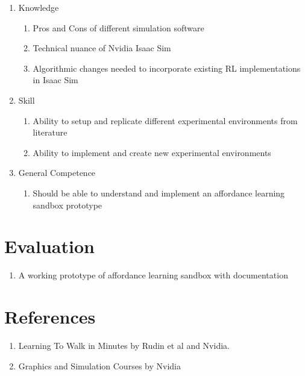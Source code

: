 \documentclass[letterpaper,12pt]{article}
\begin{document}
\begin{enumerate}
	\item Knowledge
	\begin{enumerate}
		\item Pros and Cons of different simulation software
		\item Technical nuance of Nvidia Isaac Sim
		\item Algorithmic changes needed to incorporate existing RL implementations in Isaac Sim
	\end{enumerate}
	\item Skill
	\begin{enumerate}
		\item Ability to setup and replicate different experimental environments from literature
		\item Ability to implement and create new experimental environments
	\end{enumerate}
	\item General Competence
	\begin{enumerate}
		\item Should be able to understand and implement an affordance learning sandbox prototype
	\end{enumerate}
\end{enumerate}

\section{Evaluation}

\begin{enumerate}
	\item A working prototype of affordance learning sandbox with documentation
\end{enumerate}

\section{References}

\begin{enumerate}
	\item Learning To Walk in Minutes by Rudin et al and Nvidia.
	\item Graphics and Simulation Courses by Nvidia
\end{enumerate}
\end{document}
